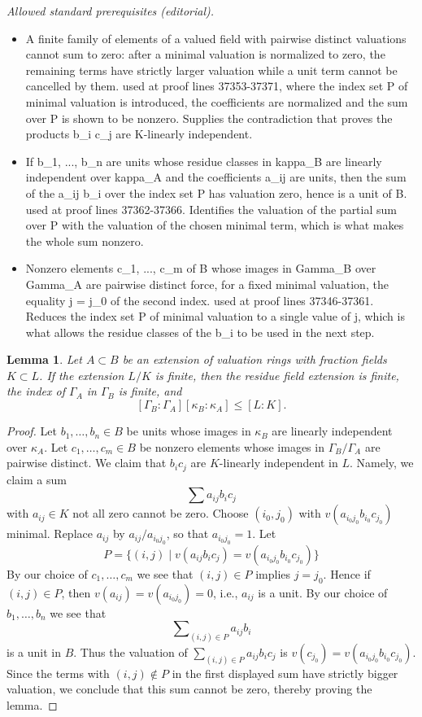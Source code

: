 \documentclass[10pt,a4paper]{amsart}
\theoremstyle{plain}
\newtheorem{lemma}[subsection]{Lemma}
\theoremstyle{definition}
\theoremstyle{remark}
\numberwithin{equation}{subsection}
\begin{document}
\noindent\textit{Allowed standard prerequisites (editorial).}\begin{itemize}
\item A finite family of elements of a valued field with pairwise distinct valuations cannot sum to zero: after a minimal valuation is normalized to zero, the remaining terms have strictly larger valuation while a unit term cannot be cancelled by them. used at proof lines 37353-37371, where the index set P of minimal valuation is introduced, the coefficients are normalized and the sum over P is shown to be nonzero. Supplies the contradiction that proves the products b\_i c\_j are K-linearly independent.
\item If b\_1, ..., b\_n are units whose residue classes in kappa\_B are linearly independent over kappa\_A and the coefficients a\_ij are units, then the sum of the a\_ij b\_i over the index set P has valuation zero, hence is a unit of B. used at proof lines 37362-37366. Identifies the valuation of the partial sum over P with the valuation of the chosen minimal term, which is what makes the whole sum nonzero.
\item Nonzero elements c\_1, ..., c\_m of B whose images in Gamma\_B over Gamma\_A are pairwise distinct force, for a fixed minimal valuation, the equality j = j\_0 of the second index. used at proof lines 37346-37361. Reduces the index set P of minimal valuation to a single value of j, which is what allows the residue classes of the b\_i to be used in the next step.
\end{itemize}\medskip
\begin{lemma}
\label{lemma-inequality-general}
Let $A \subset B$ be an extension of valuation rings with
fraction fields $K \subset L$. If the extension $L/K$
is finite, then the residue field extension is finite,
the index of $\Gamma_A$ in $\Gamma_B$ is finite, and
$$
[\Gamma_B : \Gamma_A] [\kappa_B : \kappa_A] \leq [L : K].
$$
\end{lemma}

\begin{proof}
Let $b_1, \ldots, b_n \in B$ be units whose images in $\kappa_B$
are linearly independent over $\kappa_A$. Let $c_1, \ldots, c_m \in B$
be nonzero elements whose images in $\Gamma_B/\Gamma_A$ are pairwise
distinct. We claim that $b_i c_j$ are $K$-linearly independent
in $L$. Namely, we claim a sum
$$
\sum a_{ij} b_i c_j
$$
with $a_{ij} \in K$ not all zero cannot be zero. Choose $(i_0, j_0)$ with
$v(a_{i_0j_0}b_{i_0}c_{j_0})$ minimal. Replace $a_{ij}$ by
$a_{ij}/a_{i_0j_0}$, so that $a_{i_0 j_0} = 1$. Let
$$
P = \{(i, j) \mid
v(a_{ij}b_ic_j) = v(a_{i_0j_0}b_{i_0}c_{j_0}) \}
$$
By our choice of $c_1, \ldots, c_m$ we see that $(i, j) \in P$ implies
$j = j_0$. Hence if $(i, j) \in P$, then $v(a_{ij}) = v(a_{i_0j_0}) = 0$,
i.e., $a_{ij}$ is a unit. By our choice of $b_1, \ldots, b_n$
we see that
$$
\sum\nolimits_{(i, j) \in P} a_{ij}b_i
$$
is a unit in $B$. Thus the valuation of
$\sum\nolimits_{(i, j) \in P} a_{ij}b_ic_j$ is
$v(c_{j_0}) = v(a_{i_0j_0}b_{i_0}c_{j_0})$.
Since the terms with $(i, j) \not \in P$ in the first displayed sum
have strictly bigger valuation, we conclude that this sum cannot be
zero, thereby proving the lemma.
\end{proof}
\end{document}
